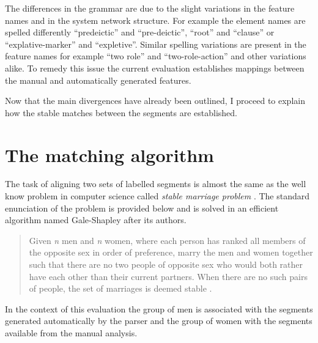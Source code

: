 The differences in the grammar are due to the slight variations in the feature names and in the system network structure. For example the element names are spelled differently ``predeictic'' and ``pre-deictic'', ``root'' and ``clause'' or ``explative-marker'' and ``expletive''. Similar spelling variations are present in the feature names for example ``two role'' and ``two-role-action'' and other variations alike. To remedy this issue the current evaluation establishes mappings between the manual and automatically generated features. 

Now that the main divergences have already been outlined, I proceed to explain how the stable matches between the segments are established.

\section{The matching algorithm}
\label{sec:stable-marriage}
The task of aligning two sets of labelled segments is almost the same as the well know problem in computer science called \textit{stable marriage problem} \citep{Gusfield1989}. The standard enunciation of the problem is provided below and is solved in an efficient algorithm named Gale-Shapley \citep{Gale1962} after its authors.

\begin{quotation}
    Given \textit{n} men and \textit{n} women, where each person has ranked all members of the opposite sex in order of preference, marry the men and women together such that there are no two people of opposite sex who would both rather have each other than their current partners. When there are no such pairs of people, the set of marriages is deemed stable \citet{iwama2008}.
\end{quotation}


In the context of this evaluation the group of men is associated with the segments generated automatically  by the parser and the group of women with the segments available from the manual analysis. 

